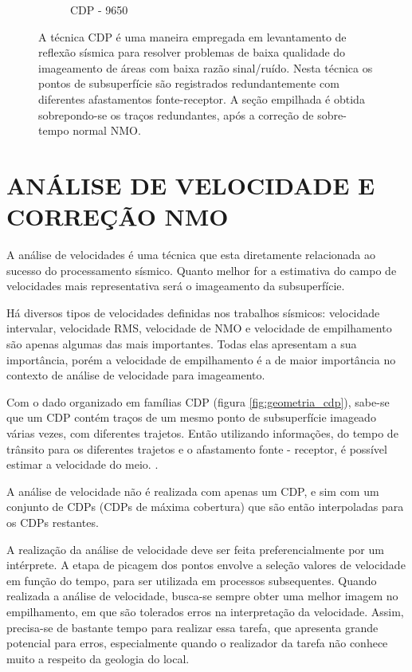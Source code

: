 \begin{landscape}
\begin{figure}[H]
\begin{subfigure}[b]{.80\textwidth}
        \caption{CDP - 9650}
        \label{fig:figure_d}
    \end{subfigure}
    \caption{A técnica CDP é uma maneira empregada em levantamento de reflexão sísmica para resolver
problemas de baixa qualidade do imageamento de áreas com baixa razão sinal/ruído. Nesta técnica
os pontos de subsuperfície são registrados redundantemente com diferentes afastamentos fonte-receptor.
A seção empilhada é obtida sobrepondo-se os traços redundantes, após a correção de sobre-tempo normal NMO.}
    \label{fig:fig_cdp2}
\end{figure}
\end{landscape}

\section{ANÁLISE DE VELOCIDADE E CORREÇÃO NMO}

A análise de velocidades é uma técnica que esta diretamente relacionada ao
sucesso do processamento sísmico. Quanto melhor for a estimativa do campo de
velocidades mais representativa será o imageamento da subsuperfície.

Há diversos tipos de velocidades definidas nos trabalhos sísmicos: velocidade
intervalar, velocidade RMS, velocidade de NMO e velocidade de empilhamento são
apenas algumas das mais importantes. Todas elas apresentam a sua importância,
porém a velocidade de empilhamento é a de maior importância no contexto de
análise de velocidade para imageamento.

Com o dado organizado em famílias CDP (figura \ref{fig:geometria_cdp}),
sabe-se que um CDP contém traços de um mesmo ponto de subsuperfície imageado várias vezes, com diferentes trajetos.
Então utilizando informações, do tempo de trânsito para os diferentes trajetos e o afastamento fonte - receptor, é
possível estimar a velocidade do meio. \citep{Yilmaz(2000)}.

A análise de velocidade não é realizada com apenas um CDP, e sim com um conjunto de
CDPs (CDPs de máxima cobertura) que são então interpoladas para os CDPs restantes.

A realização da análise de velocidade deve ser feita preferencialmente por um
intérprete. A etapa de picagem dos pontos envolve a seleção valores de velocidade
em função do tempo, para ser utilizada em processos subsequentes. Quando
realizada a análise de velocidade, busca-se sempre obter uma melhor imagem no
empilhamento, em que são tolerados erros na interpretação da velocidade. Assim,
precisa-se de bastante tempo para realizar essa tarefa, que apresenta grande
potencial para erros, especialmente quando o realizador da tarefa não conhece
muito a respeito da geologia do local.

